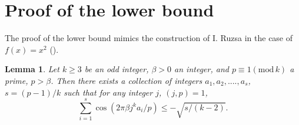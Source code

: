 \documentclass{amsart}
\newtheorem {lemma}{Lemma}
\numberwithin {equation}{section}
\begin{document}
\section{Proof of the lower bound}

The proof of the lower bound mimics the construction of I. Ruzsa in the case
of $f(x)=x^{2}$ (\cite{Ruzsa09}).

\begin{lemma}
\label{l:congruence}Let $k\geq 3$ be an odd integer, $\beta >0$ an integer,
and $p\equiv 1({\mathrm{mod}}\,k)$ a prime, $p>\beta $. Then there exists a
collection of integers $a_{1},a_{2},....,a_{s}$, $s=(p-1)/k$ such that for
any integer $j$, $(j,p)=1$, 
\begin{equation*}
\sum _{i=1}^{s}\cos (2\pi \beta j^{k}a_{i}/p)\leq -\sqrt{s/(k-2)}{\text {.}}
\end{equation*}
\end{lemma}
\end{document}
